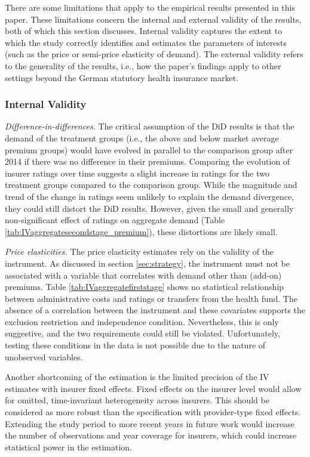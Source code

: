 \documentclass[a4paper, 11pt, english]{article}
\begin{document}
There are some limitations that apply to the empirical results presented in this paper. These limitations concern the internal and external validity of the results, both of which this section discusses. Internal validity captures the extent to which the study correctly identifies and estimates the parameters of interests (such as the price or semi-price elasticity of demand). The external validity refers to the generality of the results, i.e., how the paper's findings apply to other settings beyond the German statutory health insurance market.

\subsubsection*{Internal Validity}

\textit{Difference-in-differences.} The critical assumption of the DiD results is that the demand of the treatment groups (i.e., the above and below market average premium groups) would have evolved in parallel to the comparison group after 2014 if there was no difference in their premiums. Comparing the evolution of insurer ratings over time suggests a slight increase in ratings for the two treatment groups compared to the comparison group. While the magnitude and trend of the change in ratings seem unlikely to explain the demand divergence, they could still distort the DiD results. However, given the small and generally non-significant effect of ratings on aggregate demand (Table \ref{tab:IVaggregatesecondstage_premium}), these distortions are likely small.

\textit{Price elasticities.} The price elasticity estimates rely on the validity of the instrument. As discussed in section \ref{sec:strategy}, the instrument must not be associated with a variable that correlates with demand other than (add-on) premiums. Table \ref{tab:IVaggregatefirststage} shows no statistical relationship between administrative costs and ratings or transfers from the health fund. The absence of a correlation between the instrument and these covariates supports the exclusion restriction and independence condition. Nevertheless, this is only suggestive, and the two requirements could still be violated. Unfortunately, testing these conditions in the data is not possible due to the nature of unobserved variables.

Another shortcoming of the estimation is the limited precision of the IV estimates with insurer fixed effects. Fixed effects on the insurer level would allow for omitted, time-invariant heterogeneity across insurers. This should be considered as more robust than the specification with provider-type fixed effects. Extending the study period to more recent years in future work would increase the number of observations and year coverage for insurers, which could increase statistical power in the estimation.
\end{document}

